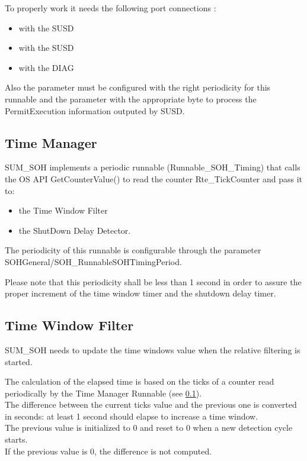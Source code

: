 To properly work it needs the following port connections :

\begin{itemize}
    \item {} with the SUSD
    \item {} with the SUSD
    \item {} with the DIAG
\end{itemize}

Also the parameter  must be configured with the right periodicity for this runnable and the parameter
 with the appropriate byte to process the PermitExecution information outputed by SUSD.


\subsection{Time Manager}
\label{subsec:timeManager}
SUM\_SOH implements a periodic runnable (Runnable\_SOH\_Timing) that calls the OS API GetCounterValue() to read the counter Rte\_TickCounter and pass it to:
\begin{itemize}
	\item the Time Window Filter
	\item the ShutDown Delay Detector.
\end{itemize}

The periodicity of this runnable is configurable through the parameter \\ SOHGeneral/SOH\_RunnableSOHTimingPeriod. \newline

Please note that this periodicity shall be less than 1 second in order to assure the proper increment of the time window timer and the shutdown delay timer.


\subsection{Time Window Filter}
\label{subsec:TimeWindowFilter}
SUM\_SOH needs to update the time windows value when the relative filtering is started. 

The calculation of the elapsed time is based on the ticks of a counter read periodically by the Time Manager Runnable (see \ref{subsec:timeManager}).\\
The difference between the current ticks value and the previous one is converted in seconds: at least 1 second should elapse to increase a time window.\\
The previous value is initialized to 0 and reset to 0 when a new detection cycle starts.\\
If the previous value is 0, the difference is not computed.


